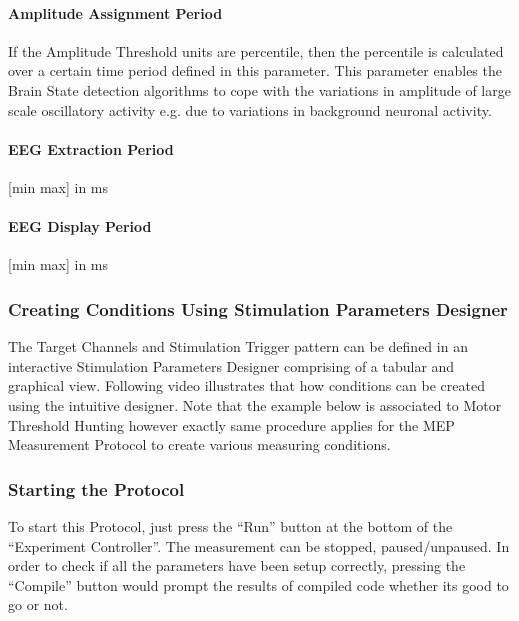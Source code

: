 \documentclass[letterpaper,10pt,english]{sphinxmanual}
\begin{document}
\paragraph{Amplitude Assignment Period}
\label{\detokenize{9_MEPMeasurement:amplitude-assignment-period}}
\sphinxAtStartPar
If the Amplitude Threshold units are percentile, then the percentile is calculated over a certain time period defined in this parameter. This parameter enables the Brain State detection algorithms to cope with the variations in amplitude of large scale oscillatory activity e.g. due to variations in background neuronal activity.


\paragraph{EEG Extraction Period}
\label{\detokenize{9_MEPMeasurement:eeg-extraction-period}}
\sphinxAtStartPar
{[}min max{]} in ms


\paragraph{EEG Display Period}
\label{\detokenize{9_MEPMeasurement:eeg-display-period}}
\sphinxAtStartPar
{[}min max{]} in ms


\subsubsection{Creating Conditions Using Stimulation Parameters Designer}
\label{\detokenize{9_MEPMeasurement:creating-conditions-using-stimulation-parameters-designer}}
\sphinxAtStartPar
The Target Channels and Stimulation Trigger pattern can be defined in an interactive Stimulation Parameters Designer comprising of a tabular and graphical view. Following video illustrates that how conditions can be created using the intuitive designer. Note that the example below is associated to Motor Threshold Hunting however exactly same procedure applies for the MEP Measurement Protocol to create various measuring conditions.


\subsubsection{Starting the Protocol}
\label{\detokenize{9_MEPMeasurement:starting-the-protocol}}
\sphinxAtStartPar
To start this Protocol, just press the “Run” button at the bottom of the “Experiment Controller”. The measurement can be stopped, paused/unpaused. In order to check if all the parameters have been setup correctly, pressing the “Compile” button would prompt the results of compiled code whether its good to go or not.
\end{document}
